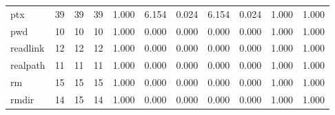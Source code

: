 \begin{longtable}{lp{1.8cm}p{1.8cm}p{1.8cm}p{1.8cm}p{1.8cm}p{1.8cm}p{1.8cm}p{1.8cm}p{1.8cm}p{1.8cm}}
ptx       &                           39 &                 39 &                                39 &                                      1.000 &                                  6.154 &                                        0.024 &                             6.154 &                                   0.024 &                              1.000 &                                              1.000 \\
pwd       &                           10 &                 10 &                                10 &                                      1.000 &                                  0.000 &                                        0.000 &                             0.000 &                                   0.000 &                              1.000 &                                              1.000 \\
readlink  &                           12 &                 12 &                                12 &                                      1.000 &                                  0.000 &                                        0.000 &                             0.000 &                                   0.000 &                              1.000 &                                              1.000 \\
realpath  &                           11 &                 11 &                                11 &                                      1.000 &                                  0.000 &                                        0.000 &                             0.000 &                                   0.000 &                              1.000 &                                              1.000 \\
rm        &                           15 &                 15 &                                15 &                                      1.000 &                                  0.000 &                                        0.000 &                             0.000 &                                   0.000 &                              1.000 &                                              1.000 \\
rmdir     &                           14 &                 15 &                                14 &                                      1.000 &                                  0.000 &                                        0.000 &                             0.000 &                                   0.000 &                              1.000 &                                              1.000 \\

\end{longtable}
